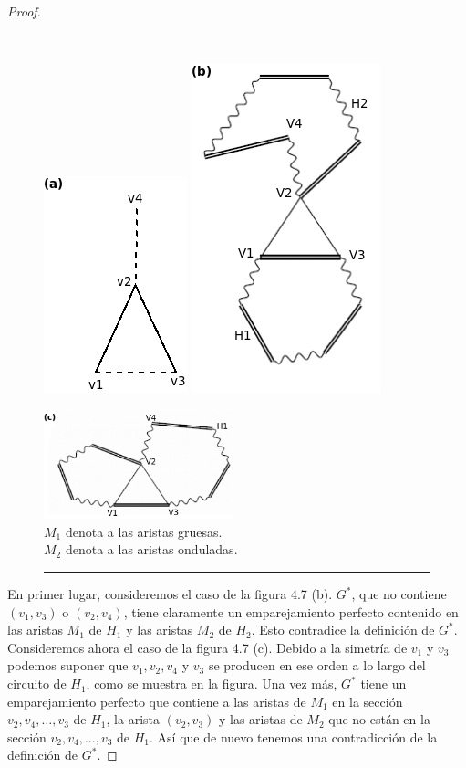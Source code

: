 \documentclass[10pt,a5paper]{book}
\begin{document}
\begin{proof}
\begin{figure}[H]
\caption{ }
\hrulefill{}\\
\parbox{4cm}
{
\includegraphics[scale=.5]{Fig4_7_a.png}
}
\parbox{4cm}
{
\includegraphics[scale=.49]{Fig4_7_b.png}
}
\begin{center}
\parbox{6cm}
{
\includegraphics[width=5.5cm]{Fig4_7_c.png}\\
$M_1$ denota a las aristas gruesas.\\
$M_2$ denota a las aristas onduladas.
}
\end{center}
\hrule{}
\end{figure}

En primer lugar, consideremos el caso de la figura 4.7 (b). $G^*$, que no contiene $(v_1,v_3)$ o $(v_2,v_4)$, tiene claramente un emparejamiento perfecto contenido en las aristas $M_1$ de $H_1$ y las aristas $M_2$ de $H_2$. Esto contradice la definición de $G^*$. Consideremos ahora el caso de la figura 4.7 (c). Debido a la simetría de $v_1$ y $v_3$ podemos suponer que $v_1, v_2, v_4$ y $v_3$ se producen en ese orden a lo largo del circuito de $H_1$, como se muestra en la figura. Una vez más, $G^*$ tiene un emparejamiento perfecto que contiene a las aristas de $M_1$ en la sección $v_2, v_4, \ldots, v_3$ de $H_1$, la arista $(v_2,v_3)$ y las aristas de $M_2$ que no están en la sección $v_2, v_4, \ldots, v_3$ de $H_1$. Así que de nuevo tenemos una contradicción de la definición de $G^*$.


\end{proof}
\end{document}
